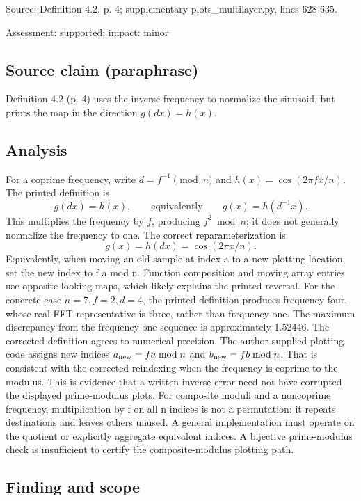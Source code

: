 \documentclass[11pt]{article}
\begin{document}
Source: Definition 4.2, p. 4; supplementary plots\_multilayer.py, lines 628-635.

Assessment: supported; impact: minor

\subsection*{Source claim (paraphrase)}

Definition 4.2 (p. 4) uses the inverse frequency to normalize the sinusoid, but prints the map in the direction \(g(dx)=h(x)\).

\subsection*{Analysis}

For a coprime frequency, write \(d=f^{-1}\pmod n\) and \(h(x)=\cos(2\pi fx/n)\). The printed definition is \[
g(dx)=h(x),\qquad\text{equivalently}\qquad g(x)=h(d^{-1}x).
\] This multiplies the frequency by \(f\), producing \(f^2\bmod n\); it does not generally normalize the frequency to one. The correct reparameterization is \[
g(x)=h(dx)=\cos(2\pi x/n).
\] Equivalently, when moving an old sample at index a to a new plotting location, set the new index to f a mod n. Function composition and moving array entries use opposite-looking maps, which likely explains the printed reversal. For the concrete case \(n=7,f=2,d=4\), the printed definition produces frequency four, whose real-FFT representative is three, rather than frequency one. The maximum discrepancy from the frequency-one sequence is approximately 1.52446. The corrected definition agrees to numerical precision. The author-supplied plotting code assigns new indices \(a_{\rm new}=fa\bmod n\) and \(b_{\rm new}=fb\bmod n\). That is consistent with the corrected reindexing when the frequency is coprime to the modulus. This is evidence that a written inverse error need not have corrupted the displayed prime-modulus plots. For composite moduli and a noncoprime frequency, multiplication by f on all n indices is not a permutation: it repeats destinations and leaves others unused. A general implementation must operate on the quotient or explicitly aggregate equivalent indices. A bijective prime-modulus check is insufficient to certify the composite-modulus plotting path.

\subsection*{Finding and scope}
\end{document}
